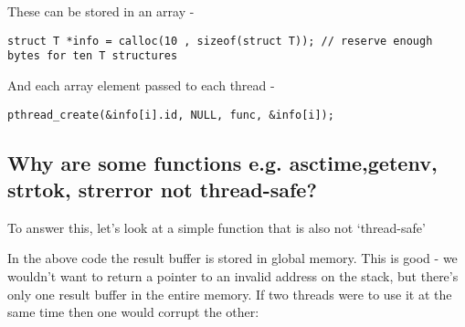 \begin{Shaded}
\begin{Highlighting}[]
 
   
   \NormalTok{result[}\NormalTok{];}
\NormalTok{\};}
\end{Highlighting}
\end{Shaded}

These can be stored in an array -

\begin{verbatim}
struct T *info = calloc(10 , sizeof(struct T)); // reserve enough bytes for ten T structures
\end{verbatim}

And each array element passed to each thread -

\begin{verbatim}
pthread_create(&info[i].id, NULL, func, &info[i]);
\end{verbatim}

\subsection{Why are some functions e.g. asctime,getenv, strtok, strerror
not
thread-safe?}\label{why-are-some-functions-e.g.-asctimegetenv-strtok-strerror-not-thread-safe}

To answer this, let's look at a simple function that is also not
`thread-safe'

\begin{Shaded}
\end{Shaded}

In the above code the result buffer is stored in global memory. This is
good - we wouldn't want to return a pointer to an invalid address on the
stack, but there's only one result buffer in the entire memory. If two
threads were to use it at the same time then one would corrupt the
other:

